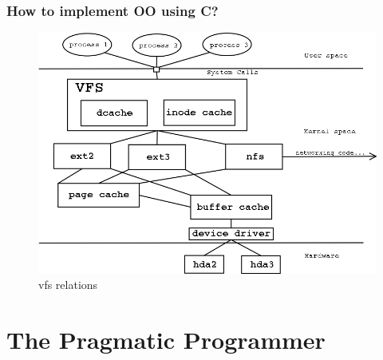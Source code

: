 \begin{frame}
  \frametitle{How to implement OO using C?}
  \begin{figure}
    \centering\includegraphics[scale=.3]{images/vfs_relations_static.png}
    \caption{vfs relations}
  \end{figure}
\end{frame}


\section{The Pragmatic Programmer}
